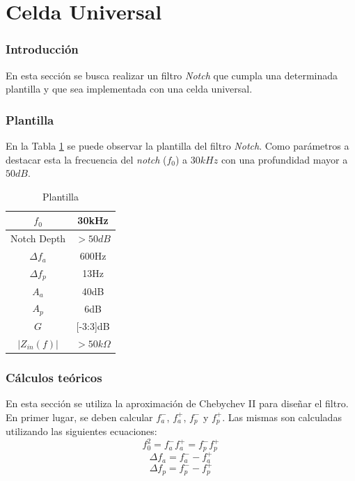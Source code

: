 \part{Celda Universal}
\section{Introducción}
En esta sección se busca realizar un filtro \textit{Notch} que cumpla una determinada plantilla y que sea implementada con una celda universal. 

\section{Plantilla}

En la Tabla \ref{tab:ej4_plantilla} se puede observar la plantilla del filtro \textit{Notch}. Como parámetros a destacar esta la frecuencia del \textit{notch} ($f_0$) a $30kHz$ con una profundidad mayor a $50 dB$.

\begin{table}[h!]
    \centering
    \begin{tabular}{|c|c|}
    \hline
    $f_0$                      & 30kHz                             \\ \hline
    Notch Depth                        & $> 50 dB$                           \\ \hline
    $\Delta f_a$                       & 600Hz                             \\ \hline
    $\Delta f_p$                        & 13Hz                              \\ \hline
    $A_a$                              & 40dB                              \\ \hline
    $A_p$                              & 6dB                               \\ \hline
    $G$                              & [-3:3]dB                               \\ \hline
    $|Z_{in}(f)|$                    & $>50k\Omega$                               \\ \hline
  
    \end{tabular}
    \caption{Plantilla}
    \label{tab:ej4_plantilla}
    \end{table}


\section{Cálculos teóricos}
En esta sección se utiliza la aproximación de Chebychev II para diseñar el filtro. En primer lugar, se deben calcular $f^-_a$, $f^+_a$, $f^-_p$ y $f^+_p$. Las mismas son calculadas utilizando las siguientes ecuaciones:
\begin{displaymath}  f^2_0 = f^-_a f^+_a = f^-_p f^+_p \end{displaymath} 
\begin{displaymath}  \Delta f_a = f^-_a - f^+_a \end{displaymath}     
\begin{displaymath}  \Delta f_ p= f^-_p - f^+_p \end{displaymath} 

